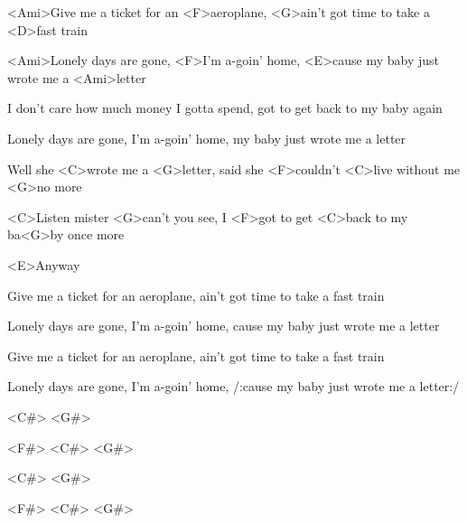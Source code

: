 


\zs
<Ami>Give me a ticket for an <F>aeroplane,
<G>ain't got time to take a <D>fast train

<Ami>Lonely days are gone, <F>I'm a-goin' home,
<E>cause my baby just wrote me a <Ami>letter
\ks


\zs
I don't care how much money I gotta spend,
got to get back to my baby again

Lonely days are gone, I'm a-goin' home,
my baby just wrote me a letter
\ks

\zr

Well she <C>wrote me a <G>letter,
said she <F>couldn't <C>live without me <G>no more


<C>Listen mister <G>can't you see,
I <F>got to get <C>back to my ba<G>by once more

<E>Anyway
\kr

\zs
Give me a ticket for an aeroplane,
ain't got time to take a fast train

Lonely days are gone, I'm a-goin' home,
cause my baby just wrote me a letter
\ks


\zr\kr


\zs

Give me a ticket for an aeroplane,
ain't got time to take a fast train

Lonely days are gone, I'm a-goin' home,
/:cause my baby just wrote me a letter:/
\ks


<C#>      <G#>

<F#>      <C#>      <G#>

<C#>      <G#>

<F#>      <C#>      <G#>


\kp
